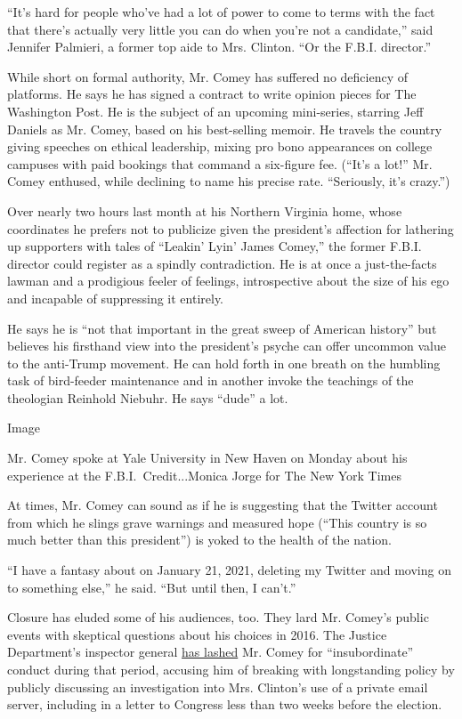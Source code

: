 ``It's hard for people who've had a lot of power to come to terms with
the fact that there's actually very little you can do when you're not a
candidate,'' said Jennifer Palmieri, a former top aide to Mrs. Clinton.
``Or the F.B.I. director.''

While short on formal authority, Mr. Comey has suffered no deficiency of
platforms. He says he has signed a contract to write opinion pieces for
The Washington Post. He is the subject of an upcoming mini-series,
starring Jeff Daniels as Mr. Comey, based on his best-selling memoir. He
travels the country giving speeches on ethical leadership, mixing pro
bono appearances on college campuses with paid bookings that command a
six-figure fee. (``It's a lot!'' Mr. Comey enthused, while declining to
name his precise rate. ``Seriously, it's crazy.'')

Over nearly two hours last month at his Northern Virginia home, whose
coordinates he prefers not to publicize given the president's affection
for lathering up supporters with tales of ``Leakin' Lyin' James Comey,''
the former F.B.I. director could register as a spindly contradiction. He
is at once a just-the-facts lawman and a prodigious feeler of feelings,
introspective about the size of his ego and incapable of suppressing it
entirely.

He says he is ``not that important in the great sweep of American
history'' but believes his firsthand view into the president's psyche
can offer uncommon value to the anti-Trump movement. He can hold forth
in one breath on the humbling task of bird-feeder maintenance and in
another invoke the teachings of the theologian Reinhold Niebuhr. He says
``dude'' a lot.

Image

Mr. Comey spoke at Yale University in New Haven on Monday about his
experience at the F.B.I.~Credit...Monica Jorge for The New York Times

At times, Mr. Comey can sound as if he is suggesting that the Twitter
account from which he slings grave warnings and measured hope (``This
country is so much better than this president'') is yoked to the health
of the nation.

``I have a fantasy about on January 21, 2021, deleting my Twitter and
moving on to something else,'' he said. ``But until then, I can't.''

Closure has eluded some of his audiences, too. They lard Mr. Comey's
public events with skeptical questions about his choices in 2016. The
Justice Department's inspector general
\href{https://www.nytimes.com/2018/06/14/us/politics/fbi-inspector-general-comey-trump-clinton-report.html}{has
lashed} Mr. Comey for ``insubordinate'' conduct during that period,
accusing him of breaking with longstanding policy by publicly discussing
an investigation into Mrs. Clinton's use of a private email server,
including in a letter to Congress less than two weeks before the
election.

